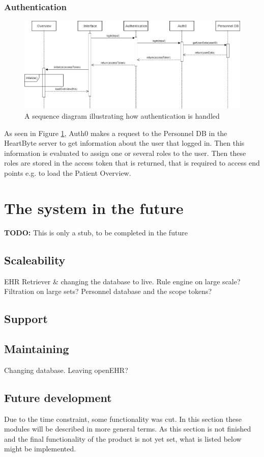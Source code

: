 \documentclass{article}
\begin{document}
\subsubsection{Authentication}
\begin{figure}[h]
    \centering
    \includegraphics[scale = 0.45]{auth-sequence}
    \caption{A sequence diagram illustrating how authentication is handled}
    \label{fig:auth-sequence}
\end{figure}

As seen in Figure \ref{fig:auth-sequence}, Auth0 makes a request to the Personnel DB in the HeartByte server to get information about the user that logged in. Then this information is evaluated to assign one or several roles to the user. Then these roles are stored in the access token that is returned, that is required to access end points e.g. to load the Patient Overview.

\clearpage
\section{The system in the future}
\textbf{TODO:} 
This is only a stub, to be completed in the future
\subsection{Scaleability}
EHR Retriever & changing the database to live. Rule engine on large scale? Filtration on large sets? Personnel database and the scope tokens?
\subsection{Support}
\subsection{Maintaining}
Changing database. Leaving openEHR? 
\subsection{Future development}
Due to the time constraint, some functionality was cut. In this section these modules will be described in more general terms. As this section is not finished and the final functionality of the product is not yet set, what is listed below might be implemented.
\end{document}
